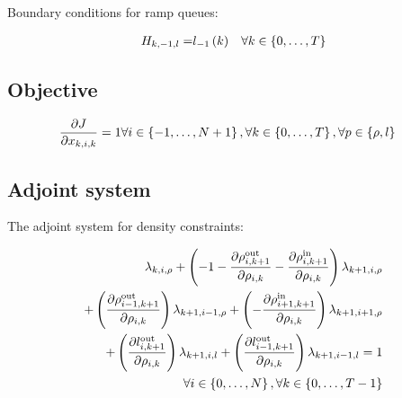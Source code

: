 Boundary conditions for ramp queues:

\begin{align*}
H_{k,-1,l}= & l_{-1}\left(k\right) & \forall k\in\left\{ 0,\ldots,T\right\} 
\end{align*}



\subsection{Objective}

\begin{align*}
\frac{\partial J}{\partial x_{k,i,k}}=1 & \forall i\in\left\{ -1,\ldots,N+1\right\} ,\forall k\in\left\{ 0,\ldots,T\right\} ,\forall p\in\left\{ \rho,l\right\} 
\end{align*}



\subsection{Adjoint system}

The adjoint system for density constraints:

\begin{align*}
\lambda_{k,i,\rho}+\left(-1-\frac{\partial\rho_{i,k+1}^{\text{out}}}{\partial\rho_{i,k}}-\frac{\partial\rho_{i,k+1}^{\text{in}}}{\partial\rho_{i,k}}\right)\lambda_{k+1,i,\rho}\\
+\left(\frac{\partial\rho_{i-1,k+1}^{\text{out}}}{\partial\rho_{i,k}}\right)\lambda_{k+1,i-1,\rho}+\left(-\frac{\partial\rho_{i+1,k+1}^{\text{in}}}{\partial\rho_{i,k}}\right)\lambda_{k+1,i+1,\rho}\\
+\left(\frac{\partial l_{i,k+1}^{\text{out}}}{\partial\rho_{i,k}}\right)\lambda_{k+1,i,l}+\left(\frac{\partial l_{i-1,k+1}^{\text{out}}}{\partial\rho_{i,k}}\right)\lambda_{k+1,i-1,l}=1\\
\forall i\in\left\{ 0,\ldots,N\right\} ,\forall k\in\left\{ 0,\ldots,T-1\right\} 
\end{align*}


